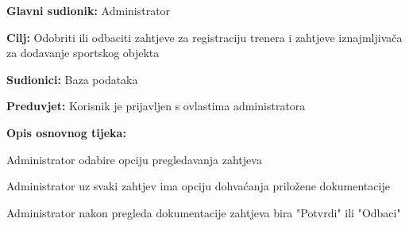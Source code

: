 						\noindent {}
					\begin{packed_item}
						
						\item \textbf{Glavni sudionik: } Administrator
						\item  \textbf{Cilj:}  Odobriti ili odbaciti zahtjeve za registraciju trenera i zahtjeve iznajmljivača za dodavanje sportskog objekta
						\item  \textbf{Sudionici:} Baza podataka
						\item  \textbf{Preduvjet:} Korisnik je prijavljen s ovlastima administratora 
						\item  \textbf{Opis osnovnog tijeka:}
						
						\item[] \begin{packed_enum}
							
							\item Administrator odabire opciju pregledavanja zahtjeva
							\item Administrator uz svaki zahtjev ima opciju dohvaćanja priložene dokumentacije
							\item Administrator nakon pregleda dokumentacije zahtjeva bira "Potvrdi" ili "Odbaci"
							
						\end{packed_enum}
						
					\end{packed_item}
					
